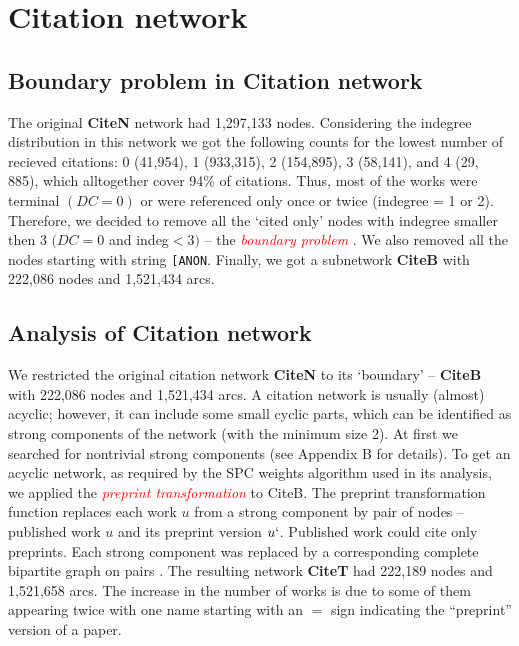 \documentclass[11pt]{article} %
\newcommand{\keyw}[1]{\textcolor{red}{\emph{#1}}}
\begin{document}
\section{Citation network}  

\subsection{Boundary problem in Citation network}

The original \textbf{CiteN} network  had 1,297,133 nodes. Considering the indegree distribution in this network we got the following  counts for the lowest number of recieved citations: 0 (41,954), 1 (933,315), 2 (154,895), 3 (58,141), and 4 (29, 885), which alltogether  cover 94\% of citations. Thus, most of the works were terminal $(DC=0)$ or were referenced only once or twice (indegree = 1 or 2). Therefore, we decided to remove all the `cited only' nodes with indegree smaller then 3 $(DC = 0$ and indeg$<3)$ -- the \keyw{boundary problem} \citep{Understand}. We also removed all the nodes starting with string \texttt{[ANON}.  Finally, we got a subnetwork \textbf{CiteB} with  222,086 nodes and 1,521,434 arcs.

\subsection{Analysis of Citation network}

We restricted the original citation network \textbf{CiteN} to its `boundary' -- \textbf{CiteB} with 222,086 nodes and 1,521,434 arcs. A citation network is usually (almost) acyclic; however, it can include some small cyclic parts, which can be identified as strong components of the network (with the minimum size 2). At first we searched for nontrivial strong components (see Appendix B for details). To get an acyclic network, as required by the SPC weights algorithm used in its analysis, we applied the \keyw{preprint transformation} to CiteB. The preprint transformation function replaces each work $u$ from a strong component by pair of nodes -- published work $u$ and its preprint version $u`$. Published work could cite only preprints. Each strong component was replaced by a corresponding complete bipartite graph on pairs \citep{Understand}. The resulting network \textbf{CiteT} had 222,189 nodes and 1,521,658 arcs. The increase in the number of works is due to some of them appearing twice with one name starting with an $=$ sign indicating the “preprint” version of a paper.\medskip
\end{document}

